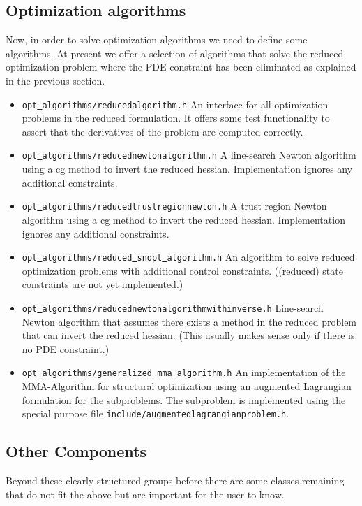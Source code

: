 \subsection{Optimization algorithms}
Now, in order to solve optimization algorithms we need to define some algorithms.
At present we offer a selection of algorithms that solve the reduced optimization 
problem where the PDE constraint has been eliminated as explained in the previous section.
\begin{itemize}
\item \texttt{opt\underline{ }algorithms/reducedalgorithm.h} An interface for all 
  optimization problems in the reduced formulation. It offers some test functionality
  to assert that the derivatives of the problem are computed correctly.
\item \texttt{opt\underline{ }algorithms/reducednewtonalgorithm.h}
  A line-search Newton algorithm using a cg method to invert the reduced hessian. 
  Implementation ignores any additional constraints.
\item \texttt{opt\underline{ }algorithms/reducedtrustregionnewton.h}
  A trust region Newton algorithm using a cg method to invert the reduced hessian.
  Implementation ignores any additional constraints.
\item \texttt{opt\underline{ }algorithms/reduced\underline{ }snopt\underline{ }algorithm.h}
  An algorithm to solve reduced optimization problems with additional control constraints.
  ((reduced) state constraints are not yet implemented.)
\item \texttt{opt\underline{ }algorithms/reducednewtonalgorithmwithinverse.h}
  Line-search Newton algorithm that assumes there exists a method in the reduced problem
  that can invert the reduced hessian. (This usually makes sense only if there is no 
  PDE constraint.)
\item \texttt{opt\underline{ }algorithms/generalized\underline{ }mma\underline{ }algorithm.h}
  An implementation of the MMA-Algorithm for structural optimization using an augmented
  Lagrangian formulation for the subproblems. The subproblem is implemented using the 
  special purpose file
  \texttt{include/augmentedlagrangianproblem.h}.
\end{itemize} 

\subsection{Other Components}
Beyond these clearly structured groups before there are some classes remaining that
do not fit the above but are important for the user to know.

